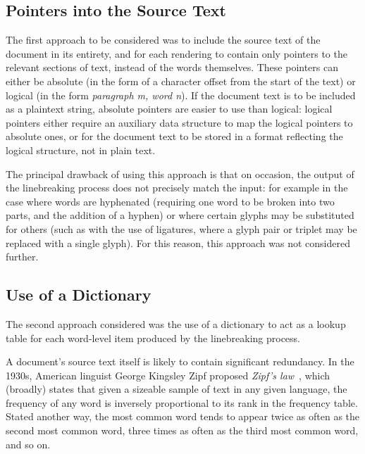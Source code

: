 \subsection{Pointers into the Source Text}
The first approach to be considered was to include the source text of the document in its entirety, and for each rendering to contain only pointers to the relevant sections of text, instead of the words themselves. These pointers can either be absolute (in the form of a character offset from the start of the text) or logical (in the form \emph{paragraph m, word n}). If the document text is to be included as a plaintext string, absolute pointers are easier to use than logical: logical pointers either require an auxiliary data structure to map the logical pointers to absolute ones, or for the document text to be stored in a format reflecting the logical structure, \ie{} not in plain text.

The principal drawback of using this approach is that on occasion, the output of the linebreaking process does not precisely match the input: for example in the case where words are hyphenated (requiring one word to be broken into two parts, and the addition of a hyphen) or where certain glyphs may be substituted for others (such as with the use of ligatures, where a glyph pair or triplet may be replaced with a single glyph). For this reason, this approach was not considered further.


\subsection{Use of a Dictionary}
\label{sec:dictionary}
The second approach considered was the use of a dictionary to act as a lookup table for each word-level item produced by the linebreaking process.

A document's source text itself is likely to contain significant redundancy. In the 1930s, American linguist George Kingsley Zipf proposed \emph{Zipf's law}~\cite{zipf1932}, which (broadly) states that given a sizeable sample of text in any given language, the frequency of any word is inversely proportional to its rank in the frequency table. Stated another way, the most common word tends to appear twice as often as the second most common word, three times as often as the third most common word, and so on.


